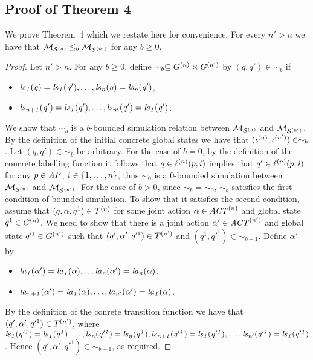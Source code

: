 \documentclass{article}
\newenvironment{customthm}[1]
  {\renewcommand\theinnercustomthm{#1}\innercustomthm}
  {\endinnercustomthm}
\begin{document}
\subsection*{Proof of Theorem 4}
We prove Theorem~4 which we restate here for convenience.
\begin{customthm}{4}
For every $n' > n$ we have that $\mathcal{M}_{\mathcal{S}^{(n)}} \leq_b \mathcal{M}_{\mathcal{S}^{(n')}}$ for any $b \geq 0$.
\end{customthm}
\begin{proof}
Let $n' > n$. For any $b \geq 0$, define $\sim_b \subseteq G^{(n)}
    \times G^{(n')}$ by $(q,q') \in \sim_b$ if
\begin{itemize}
    \item $\it{ls}_{1}(q) = \it{ls}_{1}(q'), \ldots, \it{ls}_{n}(q) = \it{ls}_{n}(q')$,
    \item $\it{ls}_{n+1}(q')=\it{ls}_{1}(q'), \ldots, \it{ls}_{n'}(q')=\it{ls}_{1}(q')$.
\end{itemize}
We show that $\sim_b$ is a $b$-bounded simulation relation between $\mathcal{M}_{\mathcal{S}^{(n)}}$
    and $\mathcal{M}_{\mathcal{S}^{(n')}}$. By the definition of the initial concrete global states we
    have that $(\iota^{({n})}, \iota^{({n'})}) \in \sim_b$. Let $(q, q') \in
    \sim_b$ be arbitrary. For the case of $b=0$, by the definition of the concrete labelling function
    it follows that $q \in \ell^{(n)}(p, i)$ implies that $q' \in \ell^{(n)}(p, i)$ for any $p \in \it{AP}$, $i \in \left \{ 1,\ldots,n \right \}$, thus $\sim_0$ is a $0$-bounded simulation between $\mathcal{M}_{\mathcal{S}^{(n)}}$ and $\mathcal{M}_{\mathcal{S}^{(n')}}$. For the case of $b > 0$, since $\sim_b = \sim_0$, $\sim_b$ satisfies the first condition of bounded simulation. To show that it satisfies the second condition, assume that $(q, \alpha, q^1) \in T^{(n)}$ for some joint action
    $\alpha \in \mathit{ACT}^{(n)}$ and global state $q^1 \in G^{(n)}$. We
    need to show that there is a joint action $\alpha' \in \mathit{ACT}^{(n')}$ and
    global state $q'^1 \in G^{(n')}$ such that $(q', \alpha', q'^1)
    \in T^{(n')}$ and  $(q^1, q'^1) \in \sim_{b-1}$.  Define $\alpha'$ by 
    \begin{itemize}
        \item $\it{la}_{1}({\alpha'}) = \it{la}_{1}({\alpha}), \ldots \it{la}_{n}({\alpha'})=\it{la}_{n}({\alpha})$,
        \item $\it{la}_{n+1}({\alpha'}) = \it{la}_{1}({\alpha}), \ldots, \it{la}_{n'}({\alpha'}) = \it{la}_{1}({\alpha})$.
    \end{itemize}
    By the definition of the conrete transition function we have that $(q',
    \alpha', q'^1) \in T^{(n')}$, where $\it{ls}_{1}(q'^1) = \it{ls}_{1}(q^1),
    \ldots, \it{ls}_{n}(q'^1)=\it{ls}_{n}(q^1),
    \it{ls}_{n+1}(q'^1)=\it{ls}_{1}(q'^1),\ldots,\it{ls}_{n'}(q'^1)=\it{ls}_{1}(q'^1)$. Hence $(q',
    \alpha', q'^1) \in \sim_{b-1}$, as required.
\end{proof}





\end{document}
